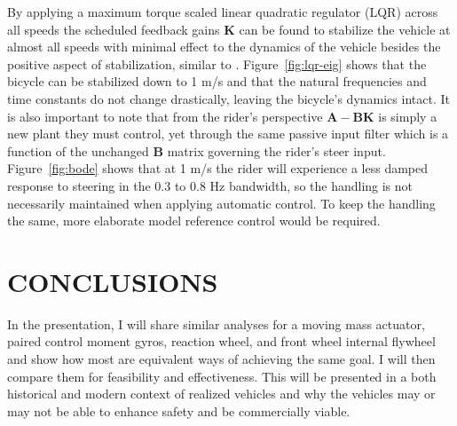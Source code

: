\documentclass{icsc}
\begin{document}
By applying a maximum torque scaled linear quadratic regulator (LQR) across all
speeds the scheduled feedback gains \(\mathbf{K}\) can be found to stabilize
the vehicle at almost all speeds with minimal effect to the dynamics of the
vehicle besides the positive aspect of stabilization, similar to
\cite{Schwab2008}. Figure~\ref{fig:lqr-eig} shows that the bicycle can be
stabilized down to 1 m/s and that the natural frequencies and time constants do
not change drastically, leaving the bicycle's dynamics intact. It is also
important to note that from the rider's perspective \(\mathbf{A} - \mathbf{B}
\mathbf{K}\) is simply a new plant they must control, yet through the same
passive input filter which is a function of the unchanged \(\mathbf{B}\) matrix
governing the rider's steer input. Figure~\ref{fig:bode} shows that at 1 m/s
the rider will experience a less damped response to steering in the 0.3 to 0.8
Hz bandwidth, so the handling is not necessarily maintained when applying
automatic control. To keep the handling the same, more elaborate model
reference control would be required.

\section{CONCLUSIONS}
%
In the presentation, I will share similar analyses for a moving mass actuator,
paired control moment gyros, reaction wheel, and front wheel internal flywheel
and show how most are equivalent ways of achieving the same goal. I will then
compare them for feasibility and effectiveness. This will be presented in a
both historical and modern context of realized vehicles and why the vehicles
may or may not be able to enhance safety and be commercially viable.



\end{document}
